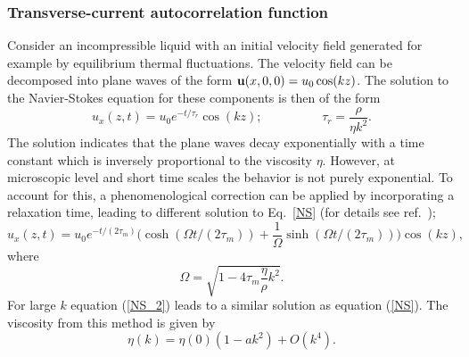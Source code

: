 \documentclass[preprint,pre,aps,superscriptaddress,a4paper]{revtex4}
\begin{document}
\subsubsection{Transverse-current autocorrelation function}
Consider an incompressible liquid with an initial velocity field generated for example by equilibrium thermal fluctuations.
The velocity field can be decomposed into plane waves of the form ${\bold u} (x,0,0)=u_0 \cos(kz)$.
The solution to the Navier-Stokes equation for these components is then of the form
\begin{equation}
u_x (z,t) = u_0 e^{-t/\tau_r} \cos (kz); \hspace{2cm} \tau_r=\frac{\rho}{\eta k^2}.
\label{NS}
\end{equation} 
The solution indicates that the plane waves decay exponentially with a time constant which is inversely proportional to the viscosity $\eta$. 
However, at microscopic level and short time scales the behavior is not purely exponential. To account for this, a phenomenological correction can be applied by incorporating a relaxation time,  leading to different solution to Eq.~\ref{NS} (for details see ref.~\cite{hess:02:0});
\begin{equation}
u_x (z,t) = u_0 e^{-t/(2\tau_m)} \big( \cosh (\Omega t/(2\tau_m))+ \frac{1}{\Omega} \sinh (\Omega t/(2\tau_m)) \big) \cos (kz),
\label{NS_2}
\end{equation} 
 where 
\begin{equation}
\Omega = \sqrt{1-4 \tau_m \frac{\eta}{\rho} k^2}.
\end{equation}
For large $k$ equation (\ref{NS_2}) leads to a similar solution as equation (\ref{NS}). The viscosity from this method is given by \citep{palmer:94:0} 
\begin{equation}
\eta (k)= \eta(0)(1-ak^2)+O(k^4). 
\label{eta_TCAF}
\end{equation} 
\end{document}
